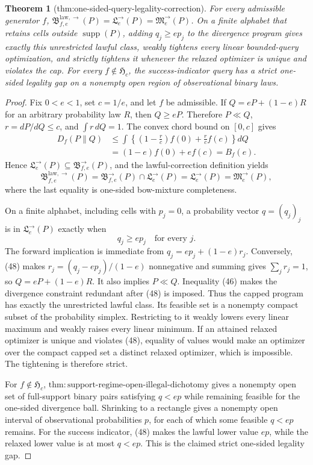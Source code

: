 \documentclass{article}
\newtheorem{theorem}{Theorem}
\begin{document}
\begin{theorem}[thm:one-sided-query-legality-correction]\label{thm:one-sided-query-legality-correction}
For every admissible generator \(f\), \(\mathfrak B^{\mathrm{law},\to}_{f,e}(P)=\mathfrak L^{\to}_e(P)=\mathfrak M^{\to}_e(P)\). On a finite alphabet that retains cells outside \(\operatorname{supp}(P)\), adding \(q_j\ge ep_j\) to the divergence program gives exactly this unrestricted lawful class, weakly tightens every linear bounded-query optimization, and strictly tightens it whenever the relaxed optimizer is unique and violates the cap. For every \(f\notin\mathfrak H_c\), the success-indicator query has a strict one-sided legality gap on a nonempty open region of observational binary laws.
\end{theorem}
\begin{proof}
Fix \(0<e<1\), set \(c=1/e\), and let \(f\) be admissible.  If \(Q=eP+(1-e)R\) for an arbitrary probability law \(R\), then \(Q\ge eP\).  Therefore \(P\ll Q\), \(r=dP/dQ\le c\), and \(\int r\,dQ=1\).  The convex chord bound on \([0,c]\) gives
\[
 \begin{aligned}
 D_f(P\|Q)
 &\le\int\left\{\left(1-\frac rc\right)f(0)+\frac rc f(c)\right\}dQ\\
 &=(1-e)f(0)+ef(c)=B_f(e).
 \end{aligned} \tag{46}
\]
Hence \(\mathfrak L^{\to}_e(P)\subseteq\mathfrak B^{\to}_{f,e}(P)\), and the lawful-correction definition yields
\[
 \mathfrak B^{\mathrm{law},\to}_{f,e}(P)
 =\mathfrak B^{\to}_{f,e}(P)\cap\mathfrak L^{\to}_e(P)
 =\mathfrak L^{\to}_e(P)=\mathfrak M^{\to}_e(P), \tag{47}
\]
where the last equality is one-sided bow-mixture completeness.

On a finite alphabet, including cells with \(p_j=0\), a probability vector \(q=(q_j)_j\) is in \(\mathfrak L^{\to}_e(P)\) exactly when
\[
 q_j\ge ep_j\quad\text{for every }j. \tag{48}
\]
The forward implication is immediate from \(q_j=ep_j+(1-e)r_j\).  Conversely, (48) makes \(r_j=(q_j-ep_j)/(1-e)\) nonnegative and summing gives \(\sum_jr_j=1\), so \(Q=eP+(1-e)R\).  It also implies \(P\ll Q\).  Inequality (46) makes the divergence constraint redundant after (48) is imposed.  Thus the capped program has exactly the unrestricted lawful class.  Its feasible set is a nonempty compact subset of the probability simplex.  Restricting to it weakly lowers every linear maximum and weakly raises every linear minimum.  If an attained relaxed optimizer is unique and violates (48), equality of values would make an optimizer over the compact capped set a distinct relaxed optimizer, which is impossible.  The tightening is therefore strict.

For \(f\notin\mathfrak H_c\), \(\mathrm{thm:support\text{-}regime\text{-}open\text{-}illegal\text{-}dichotomy}\) gives a nonempty open set of full-support binary pairs satisfying \(q<ep\) while remaining feasible for the one-sided divergence ball.  Shrinking to a rectangle gives a nonempty open interval of observational probabilities \(p\), for each of which some feasible \(q<ep\) remains.  For the success indicator, (48) makes the lawful lower value \(ep\), while the relaxed lower value is at most \(q<ep\).  This is the claimed strict one-sided legality gap.
\end{proof}
\end{document}
